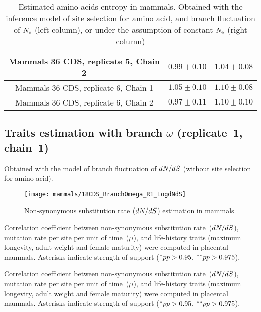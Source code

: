 \begin{table}[H]
{\begin{tabu}{|c|c|c|}
        Mammals 36 CDS, replicate 5, Chain 2 & $0.99 \pm 0.10$ & $1.04 \pm 0.08$\\ \hline
        Mammals 36 CDS, replicate 6, Chain 1 & $1.05 \pm 0.10$ & $1.10 \pm 0.08$\\ \hline
        Mammals 36 CDS, replicate 6, Chain 2 & $0.97 \pm 0.11$ & $1.10 \pm 0.10$\\ \hline
    \end{tabu}}
    \caption[Entropy of amino acids in mammals]{Estimated amino acids entropy in mammals.
    Obtained with the inference model of site selection for amino acid, and branch fluctuation of $N_{\mathrm{e}}$ (left column), or under the assumption of constant $N_{\mathrm{e}}$ (right column)}
    \label{tab:table-entropy-aa-mutselne}
\end{table}

\subsection{Traits estimation with branch \texorpdfstring{$\omega$}{ω} (replicate~1, chain~1)}
Obtained with the model of branch fluctuation of $\dnds$ (without site selection for amino acid).

\begin{figure}[H]
    \centering
    \texttt{[image: mammals/18CDS\_BranchOmega\_R1\_LogdNdS]}
    \caption[$\dnds$ estimation in mammals]{{Non-synonymous substitution} rate ($\dnds$) estimation in mammals}
\end{figure}

\begin{table}[H]
    
    \caption[Correlation coefficient matrix in mammals ($\dnds$)]{
    Correlation coefficient between non-synonymous substitution rate~($\dnds$), mutation rate per site per unit of time~($\mu$), and life-history traits (maximum longevity, adult weight and female maturity) were computed in placental mammals.
    Asterisks indicate strength of support ($\smash{^{*}} pp > 0.95$, $\smash{^{**}} pp > 0.975$).}
\end{table}

\begin{table}[H]
    
    \caption[Covariance matrix in mammals ($\dnds$)]{
    Correlation coefficient between non-synonymous substitution rate~($\dnds$), mutation rate per site per unit of time~($\mu$), and life-history traits (maximum longevity, adult weight and female maturity) were computed in placental mammals.
    Asterisks indicate strength of support ($\smash{^{*}} pp > 0.95$, $\smash{^{**}} pp > 0.975$).}
\end{table}


